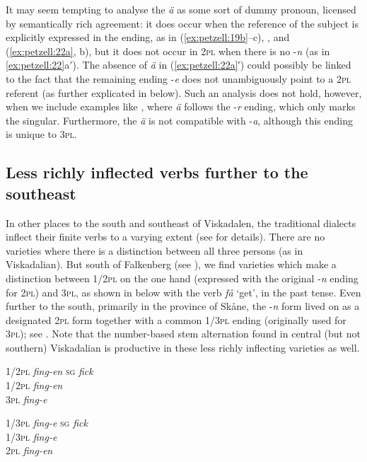 \documentclass[output=paper,colorlinks,citecolor=brown,draft,draftmode]{langscibook}
\begin{document}
It may seem tempting to analyse the \textit{ä} as some sort of dummy pronoun, licensed by semantically rich agreement: it does occur when the reference of the subject is explicitly expressed in the ending, as in (\ref{ex:petzell:19b}–c), , and (\ref{ex:petzell:22a}, b), but it does not occur in 2\textsc{pl} when there is no -\textit{n} (as in \ref{ex:petzell:22}a$'$). The absence of \textit{ä} in (\ref{ex:petzell:22a}′) could possibly be linked to the fact that the remaining ending -\textit{e} does not unambiguously point to a 2\textsc{pl} referent (as further explicated in  below). Such an analysis does not hold, however, when we include examples like , where \textit{ä} follows the -\textit{r} ending, which only marks the singular. Furthermore, the \textit{ä} is not compatible with -\textit{a}, although this ending is unique to 3\textsc{pl}.


\subsection{Less richly inflected verbs further to the southeast}\label{sec:petzell:3.2}


In other places to the south and southeast of Viskadalen, the traditional dialects inflect their finite verbs to a varying extent (see \citealt{Horn2015,Horn2017} for details). There are no varieties where there is a distinction between all three persons (as in Viskadalian). But south of Falkenberg (see ), we find varieties which make a distinction between 1/2\textsc{pl} on the one hand (expressed with the original -\textit{n} ending for 2\textsc{pl}) and 3\textsc{pl}, as shown in  below with the verb \textit{få} ‘get’, in the past tense. Even further to the south, primarily in the province of Skåne, the -\textit{n} form lived on as a designated 2\textsc{pl} form together with a common 1/3\textsc{pl} ending (originally used for 3\textsc{pl}); see . Note that the number-based stem alternation found in central (but not southern) Viskadalian is productive in these less richly inflecting varieties as well.

\ea\label{ex:petzell:23}
\begin{multicols}{2}
\ea \label{ex:petzell:23a}\begin{tabbing}
    1/2\textsc{pl}  \=   \textit{fing-en}  \kill
    \textsc{sg}     \> \textit{fick}\\                          
    1/2\textsc{pl}  \>  \textit{fing-en}\\
    3\textsc{pl}    \>    \textit{fing-e}
    \end{tabbing}
\ex \label{ex:petzell:23b}\begin{tabbing}
   1/3\textsc{pl} \= \textit{fing-e}\kill
   \textsc{sg}    \> \textit{fick}\\
   1/3\textsc{pl} \> \textit{fing-e}\\
   2\textsc{pl}   \> \textit{fing-en}
   \end{tabbing}
\z
\end{multicols}
\z
\end{document}

